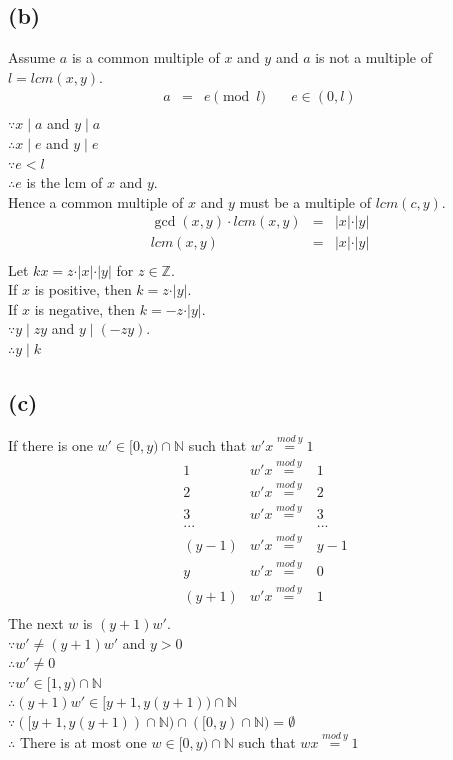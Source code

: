 \documentclass{article} %
\begin{document}
\subsection*{(b)}
Assume $a$ is a common multiple of $x$ and $y$ and $a$ is not a multiple of $l=lcm(x,y)$.\\
\[\begin{array}{rclr}
a&=&e\pmod{l}&\quad\mbox{$e\in (0,l)$}\\
\end{array}\]
$\because x\mid a$ and $y\mid a$\\
$\therefore x\mid e$ and $y\mid e$\\
$\because e<l$\\
$\therefore e$ is the lcm of $x$ and $y$.\\
Hence a common multiple of $x$ and $y$ must be a multiple of $lcm(c,y)$.\\
\[\begin{array}{rclr}
\gcd (x,y)\cdot  lcm(x,y)&=&\vert x\vert \cdot \vert y\vert\\
lcm(x,y)&=&\vert x\vert \cdot \vert y\vert\\
\end{array}\]
Let $kx=z\cdot \vert x\vert \cdot \vert y\vert$ for $z \in \mathbb{Z}$.\\
If $x$ is positive, then $k=z\cdot \vert y\vert$.\\
If $x$ is negative, then $k=-z\cdot \vert y\vert$.\\
$\because y\mid zy$ and $y\mid (-zy)$.\\
$\therefore y\mid k$\\
\subsection*{(c)}
If there is one $\mathit{w'}\in [0,y) \cap \mathbb{N}$ such that $\mathit{w'}x\overset{mod\ y}{=}1$\\
\[\begin{array}{rclr}
&1&\mathit{w'}x\overset{mod\ y}{=}&1\\
&2&\mathit{w'}x\overset{mod\ y}{=}&2\\
&3&\mathit{w'}x\overset{mod\ y}{=}&3\\
&\mbox{...}&&\mbox{...}\\
&(y-1)&\mathit{w'}x\overset{mod\ y}{=}&y-1\\
&y&\mathit{w'}x\overset{mod\ y}{=}&0\\
&(y+1)&\mathit{w'}x\overset{mod\ y}{=}&1\\
\end{array}\]
The next $\mathit{w}$ is $(y+1)\mathit{w'}$.\\
$\because {w'}\neq (y+1)\mathit{w'}$ and $y>0$\\
$\therefore {w'}\neq0$\\
$\because \mathit{w'}\in[1,y) \cap \mathbb{N}$\\
$\therefore (y+1)\mathit{w'}\in [y+1,y(y+1))\cap \mathbb{N}$\\
$\because ([y+1,y(y+1))\cap \mathbb{N})\cap([0,y) \cap \mathbb{N})=\emptyset$\\
$\therefore$ There is at most one $\mathit{w}\in [0,y) \cap \mathbb{N}$ such that $\mathit{w}x\overset{mod\ y}{=}1$\\
\end{document}
